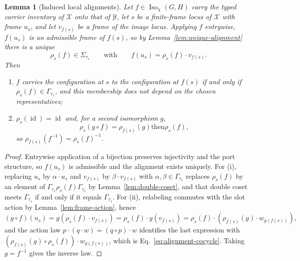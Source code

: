\documentclass[pdflatex,sn-mathphys-num,referee,lineno]{sn-jnl}
\theoremstyle{plain}
\newtheorem{lemma}[theorem]{Lemma}
\theoremstyle{remark}
\theoremstyle{definition}
\begin{document}
\begin{lemma}[Induced local alignments]
\label{lem:induced-alignment}
Let \(f\in\operatorname{Iso}_\chi(G,H)\) carry the typed carrier inventory of
\(\mathcal X\) onto that of \(\mathcal Y\), let \(s\) be a finite-frame locus of
\(\mathcal X\) with frame \(u_s\), and let \(v_{f(s)}\) be a frame of the image
locus.  Applying \(f\) entrywise, \(f(u_s)\) is an admissible frame of
\(f(s)\), so by Lemma~\ref{lem:unique-alignment} there is a unique
\[
  \rho_s(f)\in\Sigma_{\tau_s}
  \qquad\text{with}\qquad
  f(u_s)=\rho_s(f)\cdot v_{f(s)} .
\]
Then
\begin{enumerate}
  \item \(f\) carries the configuration at \(s\) to the configuration at
        \(f(s)\) if and only if \(\rho_s(f)\in\Gamma_{\tau_s}\), and this
        membership does not depend on the chosen representatives;
  \item \(\rho_s(\operatorname{id})=\operatorname{id}\) and, for a second
        isomorphism \(g\),
        \begin{equation}
          \rho_s(g\circ f)
          =\rho_{f(s)}(g)\mathbin{\mathrm{then}}\rho_s(f),
          \label{eq:alignment-cocycle}
        \end{equation}
        so \(\rho_{f(s)}(f^{-1})=\rho_s(f)^{-1}\).
\end{enumerate}
\end{lemma}

\begin{proof}
Entrywise application of a bijection preserves injectivity and the port
structure, so \(f(u_s)\) is admissible and the alignment exists uniquely.  For
(i), replacing \(u_s\) by \(\alpha\cdot u_s\) and \(v_{f(s)}\) by
\(\beta\cdot v_{f(s)}\) with \(\alpha,\beta\in\Gamma_{\tau_s}\) replaces
\(\rho_s(f)\) by an element of \(\Gamma_{\tau_s}\rho_s(f)\Gamma_{\tau_s}\) by
Lemma~\ref{lem:double-coset}, and that double coset meets \(\Gamma_{\tau_s}\)
if and only if it equals \(\Gamma_{\tau_s}\).  For (ii), relabeling commutes
with the slot action by Lemma~\ref{lem:frame-action}, hence
\[
  (g\circ f)(u_s)
  =g\!\left(\rho_s(f)\cdot v_{f(s)}\right)
  =\rho_s(f)\cdot g(v_{f(s)})
  =\rho_s(f)\cdot\left(\rho_{f(s)}(g)\cdot w_{g(f(s))}\right),
\]
and the action law \(p\cdot(q\cdot w)=(q\circ p)\cdot w\) identifies the last
expression with \(\left(\rho_{f(s)}(g)\circ\rho_s(f)\right)\cdot
w_{g(f(s))}\), which is Eq.~\eqref{eq:alignment-cocycle}.  Taking
\(g=f^{-1}\) gives the inverse law.
\end{proof}
\end{document}
